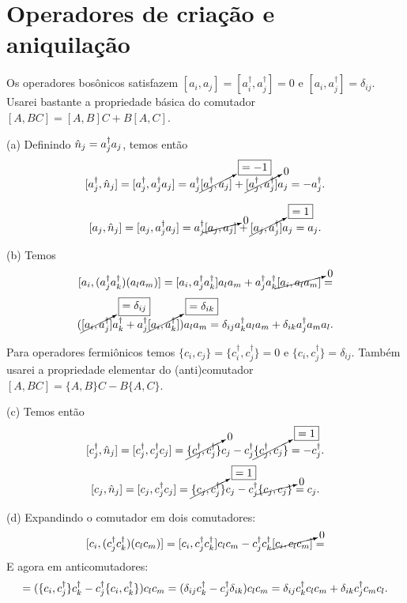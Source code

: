 \documentclass[a4paper,10pt]{article}
\begin{document}
\pagebreak



\section{Operadores de criação e aniquilação}

Os operadores bosônicos satisfazem $[a_i, a_j] = [a_i^\dagger, a_j^\dagger] = 0$ e $[a_i, a_j^\dagger] = \delta_{ij}$. Usarei bastante a propriedade básica do comutador $[A, BC] = [A, B] C + B [A, C]$.

\n

(a) Definindo $\hat{n}_j = a_j^\dagger a_j$, temos então
$$
[a_j^\dagger, \hat{n}_j] = [a_j^\dagger, a_j^\dagger a_j] = a_j^\dagger \cancelto{\boxed{= -1}}{[a_j^\dagger, a_j]} + \cancelto{0}{[a_j^\dagger,a_j^\dagger]} a_j = - a_j^\dagger.
$$

$$
[a_j, \hat{n}_j] = [a_j, a_j^\dagger a_j] = a_j^\dagger \cancelto{0}{[a_j, a_j]} + \cancelto{\boxed{=1}}{[a_j,a_j^\dagger]} a_j = a_j.
$$

\n

(b) Temos
$$
[a_i, (a_j^\dagger a_k^\dagger) (a_l a_m) ] = [a_i, a_j^\dagger a_k^\dagger] a_l a_m + a_j^\dagger a_k^\dagger \cancelto{0}{[a_i, a_l a_m]} =
$$
$$
(\cancelto{\boxed{= \delta_{ij}}}{[a_i, a_j^\dagger]} a_k^\dagger + a_j^\dagger \cancelto{\boxed{= \delta_{ik}}}{[a_i, a_k^\dagger]}) a_l a_m =
\delta_{ij} a_k^\dagger a_l a_m  +  \delta_{ik} a_j^\dagger a_m a_l.
$$

\n

Para operadores fermiônicos temos $\{c_i, c_j\} = \{c_i^\dagger, c_j^\dagger\} = 0$ e $\{c_i, c_j^\dagger\} = \delta_{ij}$. Também usarei a propriedade elementar do (anti)comutador $[A, BC] = \{A, B\} C - B \{A, C\}$.

\n

(c) Temos então
$$
[c_j^\dagger, \hat{n}_j] = [ c_j^\dagger, c_j^\dagger c_j ] = \cancelto{0}{\{c_j^\dagger, c_j^\dagger\}} c_j - c_j^\dagger \cancelto{\boxed{=1}}{\{c_j^\dagger, c_j\}} = - c_j^\dagger.
$$
$$
[c_j, \hat{n}_j] = [ c_j, c_j^\dagger c_j ] = \cancelto{\boxed{=1}}{\{c_j, c_j^\dagger\}} c_j - c_j^\dagger \cancelto{0}{\{c_j, c_j\}} = c_j.
$$

\n

(d) Expandindo o comutador em dois comutadores:
$$
[c_i, (c_j^\dagger c_k^\dagger) (c_l c_m)] = [ c_i, c_j^\dagger c_k^\dagger ] c_l c_m - c_j^\dagger c_k^\dagger \cancelto{0}{[ c_i, c_l c_m ]} =
$$
E agora em anticomutadores:
$$
= (\{c_i, c_j^\dagger\} c_k^\dagger - c_j^\dagger \{c_i, c_k^\dagger\}) c_l c_m = (\delta_{ij} c_k^\dagger - c_j^\dagger \delta_{ik}) c_l c_m
= \delta_{ij} c_k^\dagger c_l c_m + \delta_{ik} c_j^\dagger c_m c_l.
$$

\n
\end{document}
